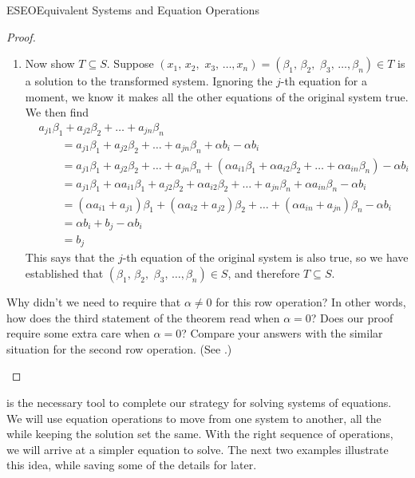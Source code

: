 \begin{subsect}{ESEO}{Equivalent Systems and Equation Operations}
\begin{proof}
\begin{para}
\begin{enumerate}
\begin{enumerate}
\begin{align*}
%
&\quad\quad=\alpha(a_{i1}\beta_1+a_{i2}\beta_2+\dots+a_{in}\beta_n)+
(a_{j1}\beta_1+a_{j2}\beta_2+\dots+a_{jn}\beta_n)\\
&\quad\quad=\alpha b_i+b_j.
\end{align*}
%
This says that the $j$-th equation of the transformed system is also true, so we have established that $(\beta_1,\,\beta_2,\,\,\beta_3,\,\ldots,\beta_n)\in T$, and therefore $S\subseteq T$.
%
\item Now show $T\subseteq S$.  Suppose $(x_1,\,x_2,\,\,x_3,\,\ldots,x_n)=(\beta_1,\,\beta_2,\,\,\beta_3,\,\ldots,\beta_n)\in T$ is a solution to the transformed system.  Ignoring the $j$-th equation for a moment, we know it makes all the other equations of the original system true.  We then find
%
\begin{align*}
&a_{j1}\beta_1+a_{j2}\beta_2+\dots+a_{jn}\beta_n\\
%
&\quad\quad=a_{j1}\beta_1+a_{j2}\beta_2+\dots+a_{jn}\beta_n +\alpha b_i -\alpha b_i\\
%
&\quad\quad=a_{j1}\beta_1+a_{j2}\beta_2+\dots+a_{jn}\beta_n +(\alpha a_{i1}\beta_1+\alpha a_{i2}\beta_2+\dots+\alpha a_{in}\beta_n) -\alpha b_i\\
%
&\quad\quad=a_{j1}\beta_1+\alpha a_{i1}\beta_1+ a_{j2}\beta_2+\alpha a_{i2}\beta_2+ \dots+ a_{jn}\beta_n+\alpha a_{in}\beta_n-\alpha b_i\\
%
&\quad\quad=(\alpha a_{i1}+a_{j1})\beta_1+(\alpha a_{i2}+a_{j2})\beta_2+\dots+(\alpha a_{in}+a_{jn})\beta_n -\alpha b_i\\
%
&\quad\quad=\alpha b_i + b_j -\alpha b_i\\
%
&\quad\quad=b_j
%
\end{align*}
%
This says that the $j$-th equation of the original system is also true, so we have established that $(\beta_1,\,\beta_2,\,\,\beta_3,\,\ldots,\beta_n)\in S$, and therefore $T\subseteq S$.
%
\end{enumerate}
%
Why didn't we need to require that $\alpha\neq 0$ for this row operation?  In other words, how does the third statement of the theorem read when $\alpha=0$?  Does our proof require some extra care when $\alpha=0$?  Compare your answers with the similar situation for the second row operation.  (See .)
\end{enumerate}
\end{para}
%
\end{proof}
%
\begin{para} is the necessary tool to complete our strategy for solving systems of equations.  We will use equation operations to move from one system to another, all the while keeping the solution set the same.  With the right sequence of operations, we will arrive at a simpler equation to solve.  The next two examples illustrate this idea, while saving some of the details for later.\end{para}

\end{subsect}
